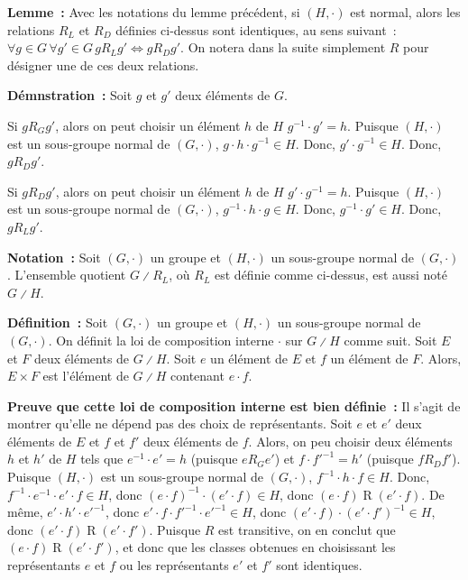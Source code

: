 \done

\medskip

\noindent\textbf{Lemme :} Avec les notations du lemme précédent, si $(H, \cdot)$ est normal, alors les relations $R_L$ et $R_D$ définies ci-dessus sont identiques, au sens suivant : $\forall g \in G \, \forall g' \in G \, g R_L g' \Leftrightarrow g R_D g'$.
    On notera dans la suite simplement $R$ pour désigner une de ces deux relations.

\medskip

\noindent\textbf{Démnstration :} 
    Soit $g$ et $g'$ deux éléments de $G$.
    
    Si $g R_G g'$, alors on peut choisir un élément $h$ de $H$ $g^{-1} \cdot g' = h$.
    Puisque $(H, \cdot)$ est un sous-groupe normal de $(G, \cdot)$, $g \cdot h \cdot g^{-1} \in H$.
    Donc, $g' \cdot g^{-1} \in H$.
    Donc, $g R_D g'$.
    
    Si $g R_D g'$, alors on peut choisir un élément $h$ de $H$ $g' \cdot g^{-1} = h$.
    Puisque $(H, \cdot)$ est un sous-groupe normal de $(G, \cdot)$, $g^{-1} \cdot h \cdot g \in H$.
    Donc, $g^{-1} \cdot g' \in H$.
    Donc, $g R_L g'$.

    \done

\medskip

\noindent\textbf{Notation :} Soit $(G, \cdot)$ un groupe et $(H, \cdot)$ un sous-groupe normal de $(G, \cdot)$.
    L'ensemble quotient $G \divslash R_L$, où $R_L$ est définie comme ci-dessus, est aussi noté $G \divslash H$.

\medskip

\noindent\textbf{Définition :} Soit $(G, \cdot)$ un groupe et $(H, \cdot)$ un sous-groupe normal de $(G, \cdot)$.
    On définit la loi de composition interne $\cdot$ sur $G \divslash H$ comme suit.
    Soit $E$ et $F$ deux éléments de $G \divslash H$.
    Soit $e$ un élément de $E$ et $f$ un élément de $F$.
    Alors, $E \times F$ est l'élément de $G \divslash H$ contenant $e \cdot f$.

\medskip

\noindent\textbf{Preuve que cette loi de composition interne est bien définie :} 
    Il s'agit de montrer qu'elle ne dépend pas des choix de représentants.
    Soit $e$ et $e'$ deux éléments de $E$ et $f$ et $f'$ deux éléments de $f$.
    Alors, on peu choisir deux éléments $h$ et $h'$ de $H$ tels que $e^{-1} \cdot e' = h$ (puisque $e R_G e'$) et $f \cdot f'^{-1} = h'$ (puisque $f R_D f'$).
    Puisque $(H, \cdot)$ est un sous-groupe normal de $(G, \cdot)$, $f^{-1} \cdot h \cdot f \in H$.
    Donc, $f^{-1} \cdot e^{-1} \cdot e' \cdot f \in H$, donc $(e \cdot f)^{-1} \cdot (e' \cdot f) \in H$, donc $(e \cdot f) \mathrel{R} (e' \cdot f)$.
    De même, $e' \cdot h' \cdot e'^{-1}$, donc $e' \cdot f \cdot f'^{-1} \cdot e'^{-1} \in H$, donc $(e' \cdot f) \cdot (e' \cdot f')^{-1} \in H$, donc $(e' \cdot f) \mathrel{R} (e' \cdot f')$.
    Puisque $R$ est transitive, on en conclut que $(e \cdot f) \mathrel{R} (e' \cdot f')$, et donc que les classes obtenues en choisissant les représentants $e$ et $f$ ou les représentants $e'$ et $f'$ sont identiques.
    
